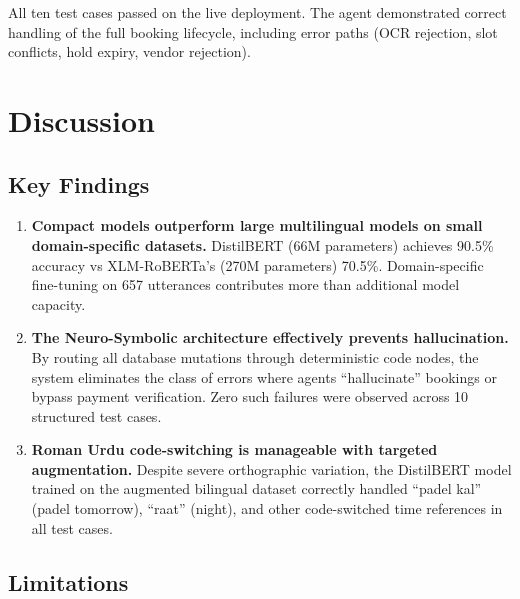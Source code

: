 \noindent All ten test cases passed on the live deployment.  The agent demonstrated
correct handling of the full booking lifecycle, including error paths (OCR rejection,
slot conflicts, hold expiry, vendor rejection).

\section{Discussion}
\label{sec:results-discussion}

\subsection{Key Findings}

\begin{enumerate}
  \item \textbf{Compact models outperform large multilingual models on small
        domain-specific datasets.}  DistilBERT (66M parameters) achieves 90.5\%
        accuracy vs XLM-RoBERTa's (270M parameters) 70.5\%.  Domain-specific
        fine-tuning on 657 utterances contributes more than additional model capacity.

  \item \textbf{The Neuro-Symbolic architecture effectively prevents hallucination.}
        By routing all database mutations through deterministic code nodes, the system
        eliminates the class of errors where agents ``hallucinate'' bookings or bypass
        payment verification.  Zero such failures were observed across 10 structured
        test cases.

  \item \textbf{Roman Urdu code-switching is manageable with targeted augmentation.}
        Despite severe orthographic variation, the DistilBERT model trained on the
        augmented bilingual dataset correctly handled ``padel kal'' (padel tomorrow),
        ``raat'' (night), and other code-switched time references in all test cases.
\end{enumerate}

\subsection{Limitations}

